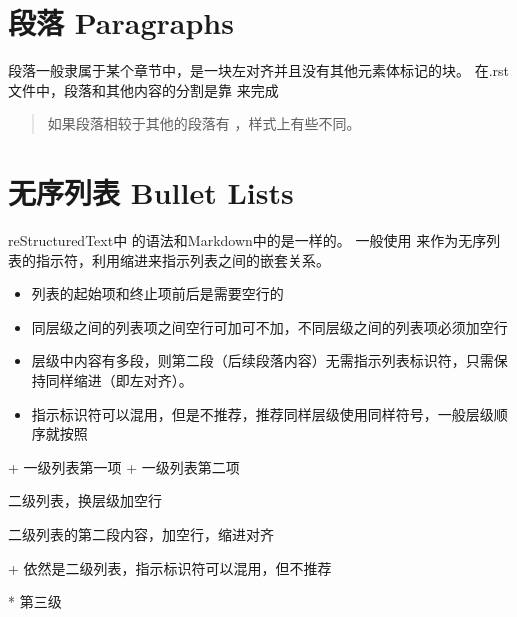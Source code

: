 \documentclass[a4paper,10pt,english]{sphinxmanual}
\begin{document}
\section{段落 Paragraphs}
\label{\detokenize{reStructureText_syntax:paragraphs}}
\sphinxAtStartPar
段落一般隶属于某个章节中，是一块左对齐并且没有其他元素体标记的块。
在.rst文件中，段落和其他内容的分割是靠  来完成
\begin{quote}

\sphinxAtStartPar
如果段落相较于其他的段落有  ，样式上有些不同。
\end{quote}


\section{无序列表 Bullet Lists}
\label{\detokenize{reStructureText_syntax:bullet-lists}}
\sphinxAtStartPar
reStructuredText中  的语法和Markdown中的是一样的。
一般使用  来作为无序列表的指示符，利用缩进来指示列表之间的嵌套关系。
\begin{itemize}
\item {} 
\sphinxAtStartPar
列表的起始项和终止项前后是需要空行的

\item {} 
\sphinxAtStartPar
同层级之间的列表项之间空行可加可不加，不同层级之间的列表项必须加空行

\item {} 
\sphinxAtStartPar
层级中内容有多段，则第二段（后续段落内容）无需指示列表标识符，只需保持同样缩进（即左对齐）。

\item {} 
\sphinxAtStartPar
指示标识符可以混用，但是不推荐，推荐同样层级使用同样符号，一般层级顺序就按照 

\end{itemize}

\sphinxAtStartPar
{}

\begin{sphinxVerbatim}[commandchars=\\\{\}]
+ 一级列表第一项
+ 一级列表第二项

  \PYGZhy{} 二级列表，换层级加空行

    二级列表的第二段内容，加空行，缩进对齐

  + 依然是二级列表，指示标识符可以混用，但不推荐

    * 第三级
\end{sphinxVerbatim}
\end{document}
